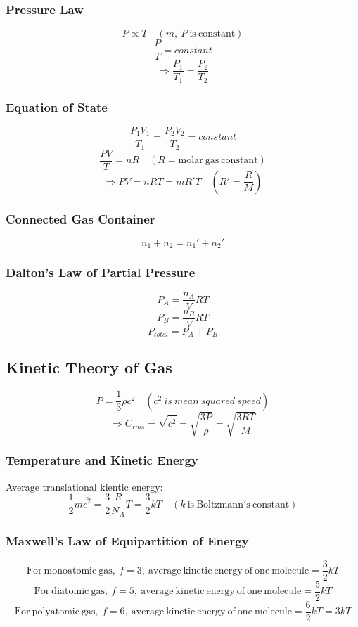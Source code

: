 \documentclass{article}
\begin{document}
\subsubsection*{Pressure Law}
\[P\propto T\quad(m,\ P\ \mathrm{is\ constant})\]
\[\frac{P}{T}=constant\]
\[\Rightarrow \frac{P_1}{T_1}=\frac{P_2}{T_2}\]

\subsubsection*{Equation of State}
\[\frac{P_1V_1}{T_1}=\frac{P_2V_2}{T_2}=constant\]
\[\frac{PV}{T}=nR\quad(R=\mathrm{molar\ gas\ constant})\]
\[\Rightarrow PV=nRT=mR'T\quad(R'=\frac{R}{M})\]

\subsubsection*{Connected Gas Container}
\[n_1 + n_2 = n_1'+n_2'\]

\subsubsection*{Dalton's Law of Partial Pressure}
\[P_A=\frac{n_A}{V}RT\]
\[P_B=\frac{n_B}{V}RT\]
\[P_{total}=P_A+P_B\]

\subsection*{Kinetic Theory of Gas}
\[P=\frac{1}{3}\rho \overline{c^2}\quad(\overline{c^2}\ is\ mean\ squared\ speed)\]
\[\Rightarrow C_{rms}=\sqrt{\overline{c^2}}=\sqrt{\frac{3P}{\rho}}=\sqrt{\frac{3RT}{M}}\]

\subsubsection*{Temperature and Kinetic Energy}
Average translational kientic energy:
\[\frac{1}{2}m\overline{c^2}=\frac{3}{2}\frac{R}{N_A}T=\frac{3}{2}kT\quad(k\ \mathrm{is\ Boltzmann's\ constant})\]

\subsubsection*{Maxwell's Law of Equipartition of Energy}
\[\mathrm{For\ monoatomic\ gas,\ }f=3,\ \mathrm{average\ kinetic\ energy\ of\ one\ molecule}=\frac{3}{2}kT\]
\[\mathrm{For\ diatomic\ gas,\ }f=5,\ \mathrm{average\ kinetic\ energy\ of\ one\ molecule}=\frac{5}{2}kT\]
\[\mathrm{For\ polyatomic\ gas,\ }f=6,\ \mathrm{average\ kinetic\ energy\ of\ one\ molecule}=\frac{6}{2}kT=3kT\]
\end{document}
